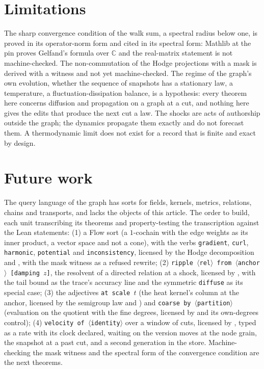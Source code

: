 \documentclass[11pt,a4paper]{article}
\theoremstyle{plain}
\theoremstyle{definition}
\theoremstyle{remark}
\begin{document}
\section{Limitations}

The sharp convergence condition of the walk sum, a spectral radius below one, is proved in its
operator-norm form and cited in its spectral form: Mathlib at the pin proves Gelfand's formula
over $\mathbb{C}$ and the real-matrix statement is not machine-checked. The non-commutation of
the Hodge projections with a mask is derived with a witness and not yet machine-checked. The
regime of the graph's own evolution, whether the sequence of snapshots has a stationary law, a
temperature, a fluctuation-dissipation balance, is a hypothesis: every theorem here concerns
diffusion and propagation on a graph at a cut, and nothing here gives the edits that produce the
next cut a law. The shocks are acts of authorship outside the graph; the dynamics propagate them
exactly and do not forecast them. A thermodynamic limit does not exist for a record that is
finite and exact by design.

\section{Future work}

The query language of the graph has sorts for fields, kernels, metrics, relations, chains and
transports, and lacks the objects of this article. The order to build, each unit transcribing
its theorems and property-testing the transcription against the Lean statements:
(1) a Flow sort (a $1$-cochain with the edge weights as its inner product, a vector space and not
a cone), with the verbs \texttt{gradient}, \texttt{curl}, \texttt{harmonic},
\texttt{potential} and \texttt{inconsistency}, licensed by the Hodge decomposition and
, with the mask witness as a refused rewrite;
(2) \texttt{ripple $\langle$rel$\rangle$ from $\langle$anchor$\rangle$ [damping $z$]}, the
resolvent of a directed relation at a shock, licensed by , with the
tail bound as the trace's accuracy line and the symmetric \texttt{diffuse} as its special case;
(3) the adjectives \texttt{at scale $t$} (the heat kernel's column at the anchor, licensed by the
semigroup law and ) and \texttt{coarse by $\langle$partition$\rangle$}
(evaluation on the quotient with the fine degrees, licensed by  and its
own-degrees control);
(4) \texttt{velocity of $\langle$identity$\rangle$} over a window of cuts, licensed by
, typed as a rate with its clock declared, waiting on the version moves at the
node grain, the snapshot at a past cut, and a second generation in the store. Machine-checking the
mask witness and the spectral form of the convergence condition are the next theorems.
\end{document}
